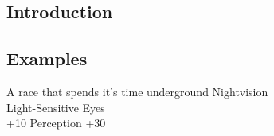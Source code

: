 
\subsection{Introduction}

\subsection{Examples}

	{A race that spends it's time underground}
	{
		Nightvision \\
		Light-Sensitive Eyes \\
		+10 Perception
	}
	{+30}
